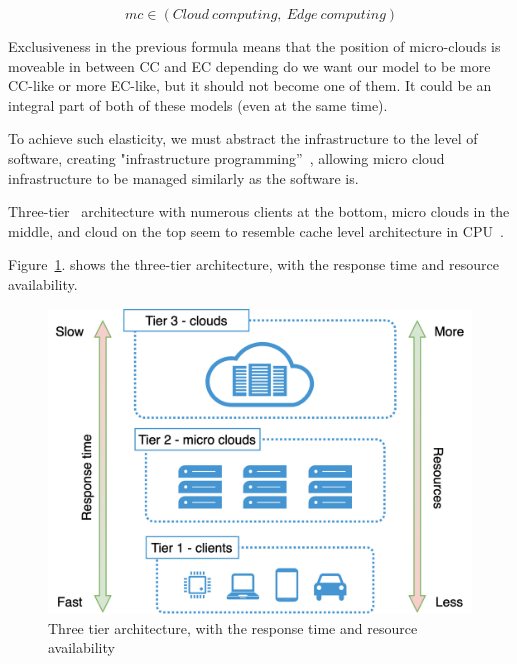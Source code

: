 \begin{equation}~\label{size:eq2}
mc \in \left( Cloud\ computing,\ Edge\ computing \right)
\end{equation}

\noindent
Exclusiveness in the previous formula means that the position of micro-clouds is moveable in between CC and EC depending do we want our model to be more CC-like or more EC-like, but it should not become one of them. It could be an integral part of both of these models (even at the same time).

To achieve such elasticity, we must abstract the infrastructure to the level of software, creating "infrastructure programming”~\cite{Fitzgerald}, allowing micro cloud infrastructure to be managed similarly as the software is.

Three-tier~\label{lab:three-tier} architecture with numerous clients at the bottom, micro clouds in the middle, and cloud on the top seem to resemble cache level architecture in CPU~\cite{FarshinRMK19}. 

Figure~\ref{fig:fig9}. shows the three-tier architecture, with the response time and resource availability.

\begin{figure}[H]
	\begin{center}
		\includegraphics{images/Figure9}
	\end{center}
	\vspace{-0.5cm}
	\caption{Three tier architecture, with the response time and resource availability}
	\label{fig:fig9}
\end{figure}

